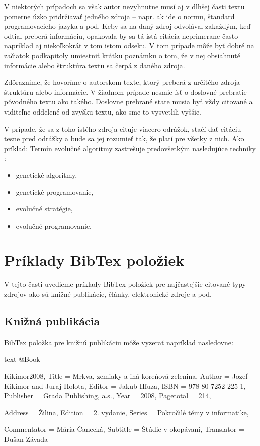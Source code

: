 V niektorých prípadoch sa však autor nevyhnutne musí aj v dlhšej časti textu pomerne úzko pridržiavať jedného zdroja -- napr. ak ide o normu, štandard programovacieho jazyka a pod. Keby sa na daný zdroj odvolával zakaždým, keď odtiaľ preberá informáciu, opakovala by sa tá istá citácia neprimerane často -- napríklad aj niekoľkokrát v tom istom odseku. V tom prípade môže byť dobré na začiatok podkapitoly umiestniť krátku poznámku o tom, že v nej obsiahnuté informácie alebo štruktúra textu sa čerpá z daného zdroja.

Zdôraznime, že hovoríme o autorskom texte, ktorý preberá z určitého zdroja štruktúru alebo informácie. V žiadnom prípade nesmie ísť o doslovné prebratie pôvodného textu ako takého. Doslovne prebrané state musia byť vždy citované a viditeľne oddelené od zvyšku textu, ako sme to vysvetlili vyššie.

V prípade, že sa z toho istého zdroja cituje viacero odrážok, stačí dať citáciu tesne pred odrážky a bude sa jej rozumieť tak, že platí pre všetky z nich. Ako príklad: Termín evolučné algoritmy zastrešuje predovšetkým nasledujúce techniky \cite{Hynek2008}:
\begin{itemize}
\item genetické algoritmy,
\item genetické programovanie,
\item evolučné stratégie,
\item evolučné programovanie.
\end{itemize}

\section{Príklady BibTex položiek}

V tejto časti uvedieme príklady BibTex položiek pre najčastejšie citované typy zdrojov ako sú knižné publikácie, články, elektronické zdroje a pod.

\subsection{Knižná publikácia}

BibTex položka pre knižnú publikáciu môže vyzerať napríklad nasledovne:
\begin{inlinecode}{text}
@Book{Kikimor2008,
  Title                    = {Mrkva, zemiaky a iná koreňová zelenina},
  Author                   = {Jozef Kikimor and Juraj Holota},
  Editor                   = {Jakub Hľuza},
  ISBN                     = {978-80-7252-225-1},
  Publisher                = {Grada Publishing, a.s.},
  Year                     = {2008},
  Pagetotal                = {214},  

  Address                  = {Žilina},
  Edition                  = {2. vydanie},
  Series                   = {Pokročilé témy v informatike},

  Commentator              = {Mária Čanecká},
  Subtitle                 = {Štúdie v okopávaní},
  Translator               = {Dušan Závada}
}
\end{inlinecode}

